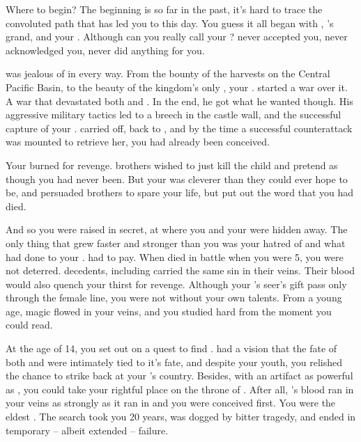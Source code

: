 \documentclass[char]{NeptuneBall}
\begin{document}
\name{\cManta{}}



Where to begin? The beginning is so far in the past, it's hard to trace the convoluted path that has led you to this day. You guess it all began with \cExExKing{\King} \cExExKing{}, \cExExKing{\King} \cKing{}'s grand\cExExKing{\parent}, and your \cExExKing{\parent}. Although can you really call \cExExKing{\them} your \cExExKing{\parent}? \cExExKing{\They} never accepted you, never acknowledged you, never did anything for you.

\cExExKing{\They} was jealous of \pPacifica{} in every way. From the bounty of the harvests on the Central Pacific Basin, to the beauty of the kingdom's only \cMother{\prince}, your \cMother{\parent} \cMother{\MYname}. \cExExKing{} started a war over it. A war that devastated both \pPacifica{} and \pAtlantis{}. In the end, he got what he wanted though. His aggressive military tactics led to a breech in the castle wall, and the successful capture of your \cMother{\parent}. \cExExKing{} carried \cMother{\them} off, back to \pAtlantis{}, and by the time a successful counterattack was mounted to retrieve her, you had already been conceived.

Your \cMother{\parent} burned for revenge. \cMother{\Them} brothers wished to just kill the child and pretend as though you had never been. But your \cMother{\parent} was cleverer than they could ever hope to be, and persuaded \cMother{\them} brothers to spare your life, but put out the word that you had died.

And so you were raised in secret, at \pAssassin{} where you and your \cMother{\parent} were hidden away. The only thing that grew faster and stronger than you was your hatred of \pAtlantis{} and what \cExExKing{} had done to your \cMother{\parent}. \cExExKing{} had to pay. When \cExExKing{\they} died in battle when you were 5, you were not deterred. \cExExKing{\Their} decedents, including \cExKing{} carried the same sin in their veins. Their blood would also quench your thirst for revenge. Although your \cMother{\parent}'s seer's gift pass only through the female line, you were not without your own talents. From a young age, magic flowed in your veins, and you studied hard from the moment you could read.

At the age of 14, you set out on a quest to find \iTrident{\MYname}. \cMother{} had a vision that the fate of both \pPacifica{} and \pAtlantis{} were intimately tied to it's fate, and despite your youth, you relished the chance to strike back at your \cExExKing{\parent}'s country. Besides, with an artifact as powerful as \iTrident{\MYname}, you could take your rightful place on the throne of \pAtlantis{}. After all, \cExExKing{}'s blood ran in your veins as strongly as it ran in \cExKing{} and you were conceived first. You were the eldest \cManta{\offspring}. The search took you 20 years, was dogged by bitter tragedy, and ended in temporary -- albeit extended -- failure. 
\end{document}
